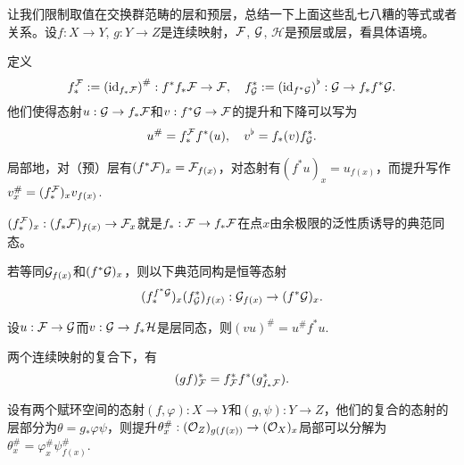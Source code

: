 \begin{para}[一些总结]
	让我们限制取值在交换群范畴的层和预层，总结一下上面这些乱七八糟的等式或者关系。设$f:X\to Y$, $g:Y\to Z$是连续映射，$\mathcal{F}$, $\mathcal{G}$, $\mathcal H$是预层或层，看具体语境。
	\begin{compactenum}
		\item 定义
		\[
			f_*^{\mathcal{F}}:=\left(\operatorname{id}_{f_*\mathcal{F}}\right)^\#: f^*f_*\mathcal{F} \to \mathcal{F}, \quad 
			f^*_{\mathcal{G}}:=\left(\operatorname{id}_{f^*\mathcal{G}}\right)^\flat : \mathcal{G} \to f_*f^*\mathcal{G}.
		\]
		他们使得态射$u:\mathcal{G}\to f_*\mathcal{F}$和$v:f^*\mathcal{G}\to\mathcal{F}$的提升和下降可以写为
		\[
			u^\# =f_*^{\mathcal{F}} f^*(u),\quad v^\flat = f_*(v) f^*_{\mathcal{G}}.
		\]
		\item 局部地，对（预）层有$(f^*\mathcal{F})_x=\mathcal{F}_{f(x)}$，对态射有$(f^*u)_x=u_{f(x)}$，而提升写作$v^\#_x=(f_*^{\mathcal{F}})_x v_{f(x)}$.
		\item $(f_*^{\mathcal{F}})_x:(f_*\mathcal{F})_{f(x)}\to \mathcal{F}_x$就是$f_*:\mathcal{F}\to f_*\mathcal{F}$在点$x$由余极限的泛性质诱导的典范同态。
		\item 若等同$\mathcal{G}_{f(x)}$和$(f^*\mathcal{G})_{x}$，则以下典范同构是恒等态射
		\[
			(f_*^{f^*\mathcal{G}})_x(f^*_{\mathcal{G}})_{f(x)}:\mathcal{G}_{f(x)}\to (f^*\mathcal{G})_{x}.
		\]
		\item 设$u:\mathcal{F}\to \mathcal{G}$而$v:\mathcal{G}\to f_*\mathcal H$是层同态，则$(vu)^\# = u^\# f^*u$.
		\item 两个连续映射的复合下，有
		\[
			(gf)^*_{\mathcal{F}} = f_{\mathcal{F}}^* f^*(g_{f_*\mathcal{F}}^*).
		\]
		\item 设有两个赋环空间的态射$(f,\varphi):X\to Y$和$(g,\psi):Y\to Z$，他们的复合的态射的层部分为$\theta = g_*\varphi \psi$，则提升$\theta^\#_x:(\mathcal{O}_Z)_{g(f(x))}\to (\mathcal{O}_X)_x$局部可以分解为$\theta^\#_x=\varphi^\#_x\psi^\#_{f(x)}$.
	\end{compactenum}
\end{para}

